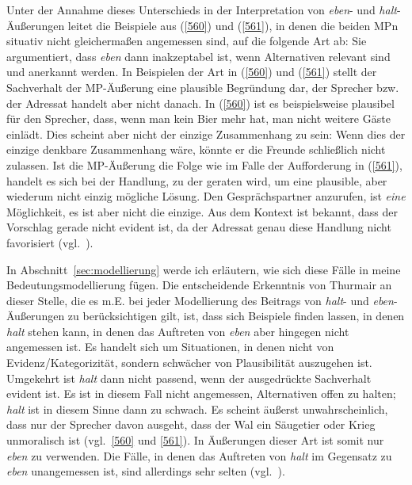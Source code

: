 Unter der Annahme dieses Unterschieds in der Interpretation von \textit{eben}- und \textit{halt}-Äußerungen leitet \citet{Thurmair1989} die Beispiele aus (\ref{560}) und (\ref{561}), in denen die beiden MPn situativ nicht gleichermaßen angemessen sind, auf die folgende Art ab: Sie argumentiert, dass \textit{eben} dann inakzeptabel ist, wenn Alternativen relevant sind und anerkannt werden. In Beispielen der Art in (\ref{560}) und (\ref{561}) stellt der Sachverhalt der MP-Äußerung eine plausible Begründung dar, der Sprecher bzw. der Adressat handelt aber nicht danach. In (\ref{560}) ist es beispielsweise plausibel für den Sprecher, dass, wenn man kein Bier mehr hat, man nicht weitere Gäste einlädt. Dies scheint aber nicht der einzige Zusammenhang zu sein: Wenn dies der einzige denkbare Zusammenhang wäre, könnte er die Freunde schließlich nicht zulassen. Ist die MP-Äußerung die Folge wie im Falle der Aufforderung in (\ref{561}), handelt es sich bei der Handlung, zu der geraten wird, um eine plausible, aber wiederum nicht einzig mögliche Lösung. Den Gesprächspartner anzurufen, ist \emph{eine} Möglichkeit, es ist aber nicht die einzige. Aus dem Kontext ist bekannt, dass der Vorschlag gerade nicht evident ist, da der Adressat genau diese Handlung nicht favorisiert (vgl.\ \citealt[127]{Thurmair1989}).

In Abschnitt~\ref{sec:modellierung} werde ich erläutern, wie sich diese Fälle in meine Bedeutung\-smodellierung fügen. Die entscheidende Erkenntnis von Thurmair an dieser Stelle, die es m.E. bei jeder Modellierung des Beitrags von \textit{halt}- und \textit{eben}-Äußerung\-en zu berücksichtigen gilt, ist, dass sich Beispiele finden lassen, in denen \textit{halt} stehen kann, in denen das Auftreten von \textit{eben} aber hingegen nicht angemessen ist. Es handelt sich um Situationen, in denen nicht von Evidenz/Kategorizität, sondern schwächer von Plausibilität auszugehen ist. Umgekehrt ist \textit{halt} dann nicht passend, wenn der ausgedrückte Sachverhalt evident ist. Es ist in diesem Fall nicht angemessen, Alternativen offen zu halten; \textit{halt} ist in diesem Sinne dann zu schwach. Es scheint äußerst unwahrscheinlich, dass nur der Sprecher davon ausgeht, dass der Wal ein Säugetier oder Krieg unmoralisch ist (vgl.\ \ref{560} und \ref{561}). In Äußerungen dieser Art ist somit nur \textit{eben} zu verwenden. Die Fälle, in denen das Auftreten von \textit{halt} im Gegensatz zu \textit{eben} unangemessen ist, sind allerdings sehr selten (vgl.\ \citealt[128]{Thurmair1989}).

